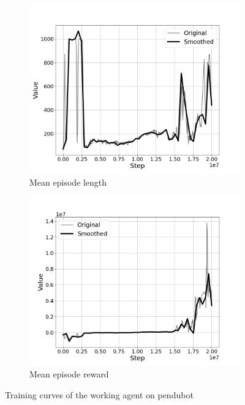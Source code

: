 \begin{figure}[H]
    \centering
    \begin{subfigure}[b]{0.48\textwidth}
        \centering
        \includegraphics[width=\textwidth]{figures/hardware_result/train_without_limit_ep_length.png}
        \caption{Mean episode length}
        \label{fig:mean episode length}
    \end{subfigure}
    \hfill %
    \begin{subfigure}[b]{0.48\textwidth}
        \centering
        \includegraphics[width=\textwidth]{figures/hardware_result/train_without_limit_ep_reward.png}
        \caption{Mean episode reward}
        \label{fig:mean episode reward}
    \end{subfigure}
    \caption{Training curves of the working agent on pendubot}
    \label{fig:training_curves_for_real_world}
\end{figure}

